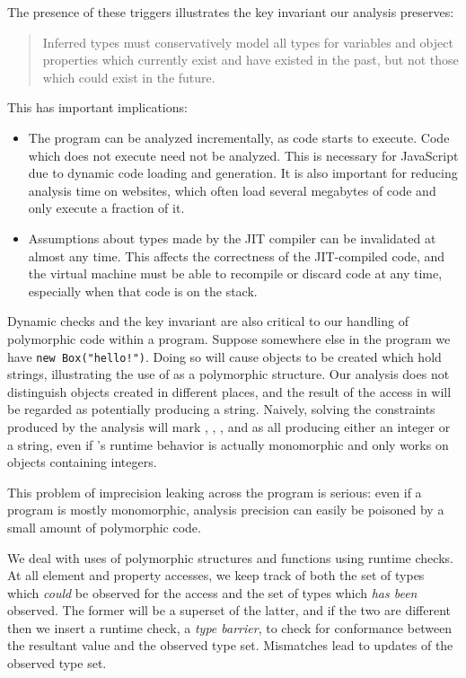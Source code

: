 The presence of these triggers illustrates the key invariant our analysis
preserves:
\begin{quote}
Inferred types must conservatively model all types for
variables and object properties which currently exist and have existed
in the past, but not those
which could exist in the future.
\end{quote}
This has important implications:

\begin{itemize}

\item The program can be analyzed incrementally, as code starts to execute.
Code which does not execute need not be analyzed.
This is necessary for JavaScript due to dynamic code loading
and generation. It is also important for reducing
analysis time on websites, which often load several megabytes of
code and only execute a fraction of it.

\item Assumptions about types made by the JIT compiler can be invalidated
at almost any time.
This affects the correctness of the JIT-compiled code, and the virtual machine
must be able to recompile or discard code at any time,
especially when that code is on the stack.

\end{itemize}

Dynamic checks and the key invariant are also critical to our handling of polymorphic code
within a program. Suppose somewhere else in the program we have
\lstinline{new Box("hello!")}.
Doing so will cause  objects
to be created which hold strings,
illustrating the use of  as a polymorphic structure.
Our analysis does not distinguish  objects created in different
places, and the result of the  access in  will
be regarded as potentially producing a string.
Naively, solving the constraints produced by the analysis will mark
, , , and  as all producing
either an integer or a string, even if 's runtime behavior is actually monomorphic
and only works on  objects containing integers.

This problem of imprecision leaking across the program is serious: even
if a program is mostly monomorphic, analysis precision can
easily be poisoned by a small amount of polymorphic code.

We deal with uses of polymorphic structures and functions using runtime checks.
At all element and property accesses, we keep track of both the set of
types which \emph{could} be observed for the access and the set of types
which \emph{has been} observed.
The former will be a superset of the latter, and if the two are different then
we insert a runtime check, a {\it type barrier}, to check for conformance
between the resultant value and the observed type set.
Mismatches lead to updates of the observed type set.

